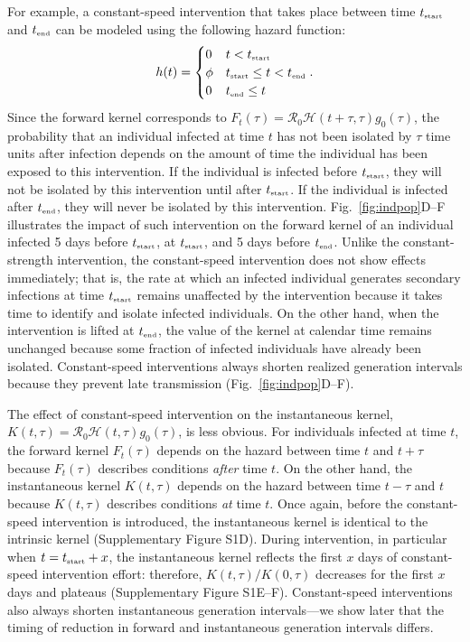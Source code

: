 \documentclass[12pt]{article}
\newcommand{\fref}[1]{Fig.~\ref{fig:#1}}
\newcommand{\Rx}[1]{\ensuremath{{\mathcal R}_{#1}}\xspace}
\newcommand{\Ro}{\Rx{0}}
\newcommand{\tsub}[2]{#1_{{\textrm{\tiny #2}}}}
\newcommand{\tstart}{\ensuremath{\tsub{t}{start}}\xspace}
\newcommand{\tend}{\ensuremath{\tsub{t}{end}}\xspace}
\newcommand{\HH}{\ensuremath{\mathcal H}}
\begin{document}
For example, a constant-speed intervention that takes place between time \tstart and \tend can be modeled using the following hazard function:
\begin{equation}
h(t) = \begin{cases}
0 & t < \tstart\\
\phi & \tstart \leq t < \tend\\
0 & \tend \leq t
\end{cases}.
\end{equation}
Since the forward kernel corresponds to $F_t(\tau) =  \Ro \HH(t+\tau, \tau) g_0(\tau)$, the probability that an individual infected at time $t$ has not been isolated by $\tau$ time units after infection depends on the amount of time the individual has been exposed to this intervention.
If the individual is infected before $\tstart$, they will not be isolated by this intervention until after $\tstart$.
If the individual is infected after $\tend$, they will never be isolated by this intervention.
\fref{indpop}D--F illustrates the impact of such intervention on the forward kernel of an individual infected 5 days before $\tstart$, at $\tstart$, and 5 days before $\tend$.
Unlike the constant-strength intervention, the constant-speed intervention does not show effects immediately;
that is, the rate at which an infected individual generates secondary infections at time $\tstart$ remains unaffected by the intervention because it takes time to identify and isolate infected individuals.
On the other hand, when the intervention is lifted at $\tend$, the value of the kernel at calendar time remains unchanged because some fraction of infected individuals have already been isolated.
Constant-speed interventions always shorten realized generation intervals because they prevent late transmission (\fref{indpop}D--F).

The effect of constant-speed intervention on the instantaneous kernel, $K(t, \tau) = \Ro \HH(t, \tau) g_0(\tau)$, is less obvious.
For individuals infected at time $t$, the forward kernel $F_t(\tau)$ depends on the hazard between time $t$ and $t+\tau$ because $F_t(\tau)$ describes conditions \emph{after} time $t$.
On the other hand, the instantaneous kernel $K(t, \tau)$ depends on the hazard between time $t-\tau$ and $t$ because $K(t, \tau)$ describes conditions \emph{at} time $t$.
Once again, before the constant-speed intervention is introduced, the instantaneous kernel is identical to the intrinsic kernel (Supplementary Figure S1D).
During intervention, in particular when $t=\tstart+x$, the instantaneous kernel reflects the first $x$ days of constant-speed intervention effort:
therefore, $K(t,\tau)/K(0, \tau)$ decreases for the first $x$ days and plateaus (Supplementary Figure S1E--F).
Constant-speed interventions also always shorten instantaneous generation intervals---we show later that the timing of reduction in forward and instantaneous generation intervals differs.
\end{document}
